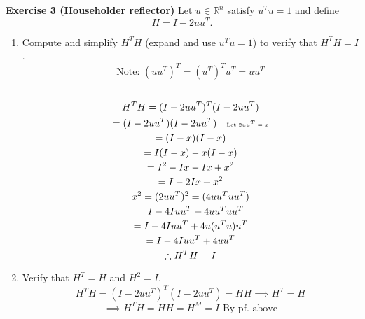 \documentclass[9pt]{article}
\theoremstyle{plain}
\begin{document}
\vspace{0.5cm}

\noindent \textbf{Exercise 3 (Householder reflector)} Let $u\in\mathbb{R}^{n}$ satisfy $u^{T}u=1$ and define
\[ H=I-2uu^T. \]
\begin{enumerate}
	\item[(a)] Compute and simplify $H^{T}H$ (expand and use $u^{T}u=1$) to verify that $H^{T}H=I$.
	      \[ \text{Note: } (uu^T)^T = (u^T)^Tu^T = uu^T \]
	      \[
		      \begin{gathered}
			      \\H^TH =
			      (I-2uu^T)^T (I-2uu^T)
			      \\ = (I-2uu^T) (I-2uu^T) \quad  \tiny{\text{Let $2uu^T=x$}}
			      \\ = (I-x)(I-x)
			      \\ = I(I-x)-x(I-x)
			      \\ = I^2 -Ix -Ix +x^2
			      \\ = I -2Ix+x^2
			      \\ x^2 = (2uu^T)^2 = (4uu^Tuu^T)
			      \\ = I-4Iuu^T+4uu^Tuu^T
			      \\ = I-4Iuu^T+4u(u^Tu)u^T
			      \\ = I-4Iuu^T+4uu^T
			      \\ \therefore H^TH = I
		      \end{gathered}
	      \]
	\item[(b)] Verify that $H^{T}=H$ and $H^{2}=I.$
	      \[ H^TH = (I-2uu^T)^T (I-2uu^T) = HH \implies H^T = H \]
          \[ \implies H^TH = HH = H^M = I \text{ By pf. above} \] 
\end{enumerate}
\end{document}
